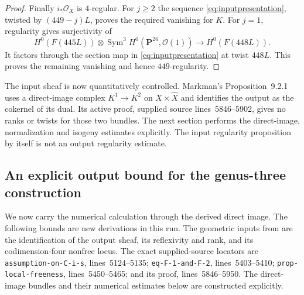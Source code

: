 \documentclass[11pt,a4paper]{article}
\theoremstyle{definition}\newtheorem{definition}[theorem]{Definition}
\theoremstyle{remark}\newtheorem{remark}[theorem]{Remark}
\newcommand{\cO}{\mathcal O}\newcommand{\CH}{\operatorname{CH}}\newcommand{\cl}{\operatorname{cl}}
\begin{document}
\begin{proof}
Finally $i_*\cO_X$ is $4$-regular. For $j\ge2$ the sequence \eqref{eq:inputpresentation}, twisted by $(449-j)L$, proves the required vanishing for $K$. For $j=1$, regularity gives surjectivity of
\[
 H^0(F(445L))\otimes\operatorname{Sym}^3H^0(\mathbf P^{26},\cO(1))
 \longrightarrow H^0(F(448L)).
\]
It factors through the section map in \eqref{eq:inputpresentation} at twist $448L$. This proves the remaining vanishing and hence $449$-regularity.
\end{proof}

The input sheaf is now quantitatively controlled. Markman's Proposition~9.2.1 uses a direct-image complex $K^1\to K^2$ on $X\times\widehat X$ and identifies the output as the cokernel of its dual. Its active proof, supplied source lines~5846--5902, gives no ranks or twists for those two bundles. The next section performs the direct-image, normalization and isogeny estimates explicitly. The input regularity proposition by itself is not an output regularity estimate.



\subsection{An explicit output bound for the genus-three construction}
\label{sec:markmanquantitative}

We now carry the numerical calculation through the derived direct image.
The following bounds are new derivations in this run. The geometric inputs
from \citet[Proposition~9.2.1]{Markman25} are the identification of the
output sheaf, its reflexivity and rank, and its codimension-four nonfree
locus. The exact supplied-source locators are
\texttt{assumption-on-C-i-s}, lines~5124--5135;
\texttt{eq-F-1-and-F-2}, lines~5403--5410;
\texttt{prop-local-freeness}, lines~5450--5465; and its proof,
lines~5846--5950. The direct-image bundles and their numerical estimates
below are constructed explicitly.
\end{document}
